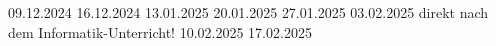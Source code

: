 \renewcommand{\Klassetext}{10b}



\dbprojekt%
{09.12.2024} %
{16.12.2024} %
{13.01.2025} %
{20.01.2025} %
{27.01.2025} %
{03.02.2025} %
{direkt nach dem Informatik-Unterricht!} %
{10.02.2025} %
{17.02.2025} %